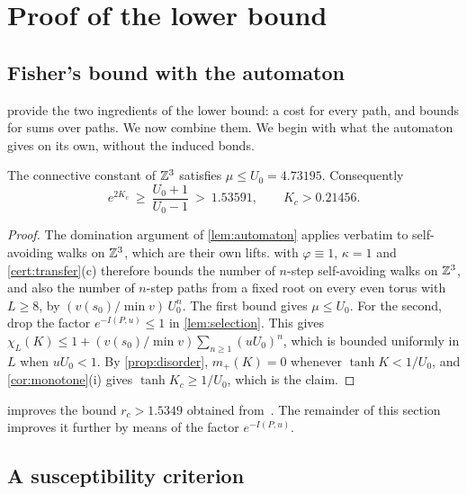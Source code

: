 \section{Proof of the lower bound}\label{sec:lower}

\subsection{Fisher's bound with the automaton}

 provide the two ingredients of the lower bound: a cost for every path, and bounds for sums over paths. We now combine them. We begin with what the automaton gives on its own, without the induced bonds.

\begin{proposition}\label{prop:fisher}
The connective constant of $\mathbb Z^3$ satisfies $\mu\le U_0=4.73195$. Consequently
\[
 e^{2K_c}\ \ge\ \frac{U_0+1}{U_0-1}\ >\ 1.53591,\qquad K_c>0.21456 .
\]
\end{proposition}

\begin{proof}
The domination argument of \cref{lem:automaton} applies verbatim to self-avoiding walks on $\mathbb Z^3$, which are their own lifts.  with $\varphi\equiv1$, $\kappa=1$ and \cref{cert:transfer}(c) therefore bounds the number of $n$-step self-avoiding walks on $\mathbb Z^3$, and also the number of $n$-step paths from a fixed root on every even torus with $L\ge8$, by $(v(s_0)/\min v)\,U_0^n$. The first bound gives $\mu\le U_0$. For the second, drop the factor $e^{-I(P,u)}\le1$ in \cref{lem:selection}. This gives $\chi_L(K)\le1+(v(s_0)/\min v)\sum_{n\ge1}(uU_0)^n$, which is bounded uniformly in $L$ when $uU_0<1$. By \cref{prop:disorder}, $m_+(K)=0$ whenever $\tanh K<1/U_0$, and \cref{cor:monotone}(i) gives $\tanh K_c\ge1/U_0$, which is the claim.
\end{proof}

 improves the bound $r_c>1.5349$ obtained from~\cite{PT00}. The remainder of this section improves it further by means of the factor $e^{-I(P,u)}$.

\subsection{A susceptibility criterion}

